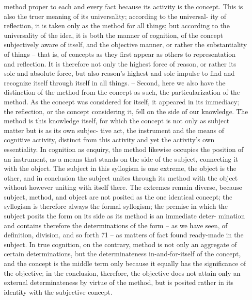 method proper to each and every fact because its activity is the concept.
This is also the truer meaning of its universality; according to the universal-
ity of reflection, it is taken only as the method for all things; but according
to the universality of the idea, it is both the manner of cognition, of the
concept subjectively aware of itself, and the objective manner, or rather the
substantiality of things – that is, of concepts as they first appear as others
to representation and reflection. It is therefore not only the highest force of
reason, or rather its sole and absolute force, but also reason’s highest and
sole impulse to find and recognize itself through itself in all things. – Second,
here we also have the distinction of the method from the concept as such, the
particularization of the method. As the concept was considered for itself,
it appeared in its immediacy; the reflection, or the concept considering it,
fell on the side of our knowledge. The method is this knowledge itself, for
which the concept is not only as subject matter but is as its own subjec-
tive act, the instrument and the means of cognitive activity, distinct from
this activity and yet the activity’s own essentiality. In cognition as enquiry,
the method likewise occupies the position of an instrument, as a means
that stands on the side of the subject, connecting it with the object. The
subject in this syllogism is one extreme, the object is the other, and in
conclusion the subject unites through its method with the object without
however uniting with itself there. The extremes remain diverse, because
subject, method, and object are not posited as the one identical concept; the
syllogism is therefore always the formal syllogism; the premise in which
the subject posits the form on its side as its method is an immediate deter-
mination and contains therefore the determinations of the form – as we
have seen, of definition, division, and so forth 71 – as matters of fact found
ready-made in the subject. In true cognition, on the contrary, method is
not only an aggregate of certain determinations, but the determinateness
in-and-for-itself of the concept, and the concept is the middle term only
because it equally has the significance of the objective; in the conclusion,
therefore, the objective does not attain only an external determinateness by
virtue of the method, but is posited rather in its identity with the subjective
concept.
